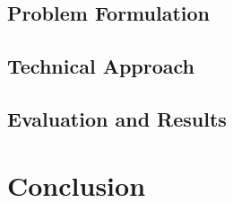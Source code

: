 \documentclass[Dual]{iitddiss}
\begin{document}
\section{Problem Formulation}


\section{Technical Approach}

\section{Evaluation and Results}

\pagebreak

\chapter{Conclusion}

\pagebreak
% 
% 



% 

% 

% 

% 
% 
\end{document}
